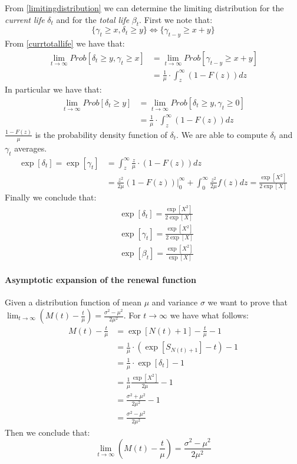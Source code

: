 From \ref{limitingdistribution} we can determine the limiting distribution for the \textit{current life} $\delta_t$ and for the \textit{total life} $\beta_t$. First we note that:
\begin{equation}
	\{\gamma_t \geq x, \delta_t \geq y \} \Leftrightarrow \{\gamma_{t-y} \geq x+y \}
	\label{currtotallife}
\end{equation}
From \ref{currtotallife} we have that:
\begin{align*}
	\lim_{t \rightarrow \infty} Prob[\delta_t \geq y, \gamma_t \geq x] & = \lim_{t \rightarrow \infty} Prob[\gamma_{t-y} \geq x+y] \\ & = \frac{1}{\mu} \cdot \int_z^{\infty}(1-F(z))dz
\end{align*}
In particular we have that:
\begin{align*}
	\lim_{t \rightarrow \infty} Prob[\delta_t \geq y] & = \lim_{t \rightarrow \infty} Prob[\delta_t \geq y, \gamma_{t} \geq 0] \\ & = \frac{1}{\mu} \cdot \int_z^{\infty}(1-F(z))dz
\end{align*}
$\frac{1-F(z)}{\mu}$ is the probability density function of $\delta_t$. We are able to compute $\delta_t$ and $\gamma_t$ averages.
\begin{align*}
	\exp[\delta_t]=\exp[\gamma_t] & =\int_z^{\infty} \frac{z}{\mu} \cdot (1-F(z))dz \\ & = \frac{z^2}{2\mu}(1-F(z))|_0^{\infty}+\int_0^{\infty}\frac{z^2}{2 \mu} f(z)dz= \frac{\exp[X^2]}{2 \exp[X]}
\end{align*}
Finally we conclude that:
\begin{align}
	& \exp[\delta_t] = \frac{\exp[X^2]}{2 \exp[X]}
	\\ & \exp[\gamma_t] = \frac{\exp[X^2]}{2 \exp[X]}
	\\ & \exp[\beta_t] = \frac{\exp[X^2]}{\exp[X]}
\end{align}

\paragraph{Asymptotic expansion of the renewal function}

Given a distribution function of mean $\mu$ and variance $\sigma$ we want to prove that $\lim_{t \rightarrow \infty} (M(t) - \frac{t}{\mu}) = \frac{\sigma^2-\mu^2}{2\mu^2}$. For $t \rightarrow \infty$ we have what follows:
\begin{align*}
	M(t)-\frac{t}{\mu} & =\exp[N(t)+1]-\frac{t}{\mu}-1 \\
	& = \frac{1}{\mu} \cdot (\exp[S_{N(t)+1}]-t)-1 \\
	& = \frac{1}{\mu} \cdot \exp[\delta_t]-1 \\
	& = \frac{1}{\mu}\frac{\exp[X^2]}{2\mu}-1 \\
	& = \frac{\sigma^2+\mu^2}{2\mu^2}-1 \\
	& = \frac{\sigma^2-\mu^2}{2\mu^2}
\end{align*}
Then we conclude that:
\begin{equation}
	\lim_{t \rightarrow \infty} (M(t) - \frac{t}{\mu}) = \frac{\sigma^2-\mu^2}{2\mu^2}
\end{equation}

